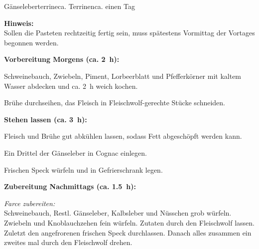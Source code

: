 \begin{MyRecipe}{Gänseleberterrine}{ca.  Terrinen}{ca. einen Tag}

\textbf{Hinweis:}\\
Sollen die Pasteten rechtzeitig fertig sein, muss spätestens Vormittag der Vortages begonnen werden.\par\bigskip

\textbf{Vorbereitung Morgens (ca. \SI{2}{\hour}):}


Schweinebauch, Zwiebeln, Piment, Lorbeerblatt und Pfefferkörner mit kaltem Wasser abdecken und ca. \SI{2}{\hour} weich kochen.\par
Brühe durchseihen, das Fleisch in Fleischwolf-gerechte Stücke schneiden.\par\bigskip

\textbf{Stehen lassen (ca. \SI{3}{\hour}):}

Fleisch und Brühe gut abkühlen lassen, sodass Fett abgeschöpft werden kann.\par
Ein Drittel der Gänseleber in Cognac einlegen.\par
Frischen Speck würfeln und in Gefrierschrank legen.\par\bigskip

\textbf{Zubereitung Nachmittags (ca. \SI{1,5}{\hour}):}

\textit{Farce zubereiten:}\\	
Schweinebauch, Restl. Gänseleber, Kalbsleber und Nüsschen grob würfeln. Zwiebeln und Knoblauchzehen fein würfeln. Zutaten durch den Fleischwolf lassen. Zuletzt den angefrorenen frischen Speck durchlassen. Danach alles zusammen ein zweites mal durch den Fleischwolf drehen.



\end{MyRecipe}
